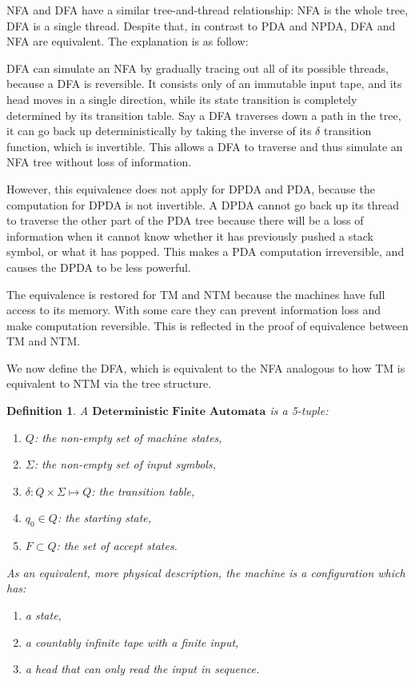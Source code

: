 \documentclass[12pt]{article}  %
\newtheorem{definition}{Definition}
\begin{document}
NFA and DFA have a similar tree-and-thread relationship: NFA is the whole tree, DFA is a single thread. Despite that, in contrast to PDA and NPDA, DFA and NFA are equivalent. The explanation is as follow:

DFA can simulate an NFA by gradually tracing out all of its possible threads, because a DFA is reversible. It consists only of an immutable input tape, and its head moves in a single direction, while its state transition is completely determined by its transition table. Say a DFA traverses down a path in the tree, it can go back up deterministically by taking the inverse of its $\delta$ transition function, which is invertible. This allows a DFA to traverse and thus simulate an NFA tree without loss of information.

However, this equivalence does not apply for DPDA and PDA, because the computation for DPDA is not invertible. A DPDA cannot go back up its thread to traverse the other part of the PDA tree because there will be a loss of information when it cannot know whether it has previously pushed a stack symbol, or what it has popped. This makes a PDA computation irreversible, and causes the DPDA to be less powerful.

The equivalence is restored for TM and NTM because the machines have full access to its memory. With some care they can prevent information loss and make computation reversible. This is reflected in the proof of equivalence between TM and NTM.

We now define the DFA, which is equivalent to the NFA analogous to how TM is equivalent to NTM via the tree structure.

\begin{definition}
A $\textbf{Deterministic Finite Automata}$ is a 5-tuple:
\begin{enumerate}
	\item $Q$: the non-empty set of machine states,
	\item $\Sigma$: the non-empty set of input symbols,
	\item $\delta: Q \times \Sigma \mapsto Q$: the transition table,
	\item $q_0 \in Q$: the starting state,
	\item $F \subset Q$: the set of accept states.
\end{enumerate}

As an equivalent, more physical description, the machine is a configuration which has:
\begin{enumerate}
	\item a state,
	\item a countably infinite tape with a finite input,
	\item a head that can only read the input in sequence.
\end{enumerate}
\end{definition}
\end{document}

